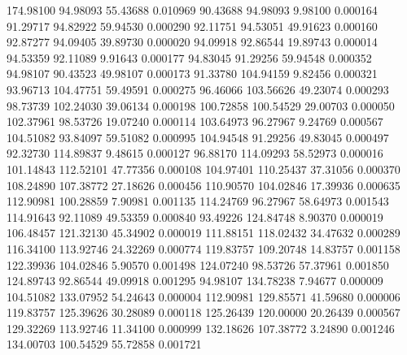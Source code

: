       174.98100       94.98093       55.43688       0.010969
       90.43688       94.98093        9.98100       0.000164
       91.29717       94.82922       59.94530       0.000290
       92.11751       94.53051       49.91623       0.000160
       92.87277       94.09405       39.89730       0.000020
       94.09918       92.86544       19.89743       0.000014
       94.53359       92.11089        9.91643       0.000177
       94.83045       91.29256       59.94548       0.000352
       94.98107       90.43523       49.98107       0.000173
       91.33780      104.94159        9.82456       0.000321
       93.96713      104.47751       59.49591       0.000275
       96.46066      103.56626       49.23074       0.000293
       98.73739      102.24030       39.06134       0.000198
      100.72858      100.54529       29.00703       0.000050
      102.37961       98.53726       19.07240       0.000114
      103.64973       96.27967        9.24769       0.000567
      104.51082       93.84097       59.51082       0.000995
      104.94548       91.29256       49.83045       0.000497
       92.32730      114.89837        9.48615       0.000127
       96.88170      114.09293       58.52973       0.000016
      101.14843      112.52101       47.77356       0.000108
      104.97401      110.25437       37.31056       0.000370
      108.24890      107.38772       27.18626       0.000456
      110.90570      104.02846       17.39936       0.000635
      112.90981      100.28859        7.90981       0.001135
      114.24769       96.27967       58.64973       0.001543
      114.91643       92.11089       49.53359       0.000840
       93.49226      124.84748        8.90370       0.000019
      106.48457      121.32130       45.34902       0.000019
      111.88151      118.02432       34.47632       0.000289
      116.34100      113.92746       24.32269       0.000774
      119.83757      109.20748       14.83757       0.001158
      122.39936      104.02846        5.90570       0.001498
      124.07240       98.53726       57.37961       0.001850
      124.89743       92.86544       49.09918       0.001295
       94.98107      134.78238        7.94677       0.000009
      104.51082      133.07952       54.24643       0.000004
      112.90981      129.85571       41.59680       0.000006
      119.83757      125.39626       30.28089       0.000118
      125.26439      120.00000       20.26439       0.000567
      129.32269      113.92746       11.34100       0.000999
      132.18626      107.38772        3.24890       0.001246
      134.00703      100.54529       55.72858       0.001721
